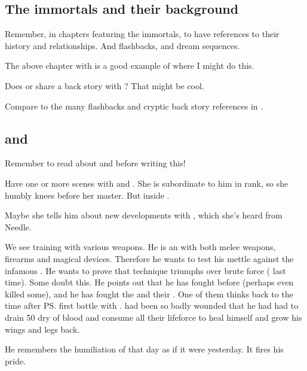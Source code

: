 \subsection{The immortals and their background}
Remember, in chapters featuring the immortals, to have references to their history and relationships. 
And flashbacks, and dream sequences.

The above chapter with \Achsah{} is a good example of where I might do this. 

Does \Achsah{} or \Teshrial{} share a back story with \Ishnaruchaefir? 
That might be cool. 

Compare to the many flashbacks and cryptic back story references in \cite{StevenEriksonIanCameronEsslemont:MalazanBookoftheFallen}. 









\subsection{\Achsah{} and \Teshrial}
Remember to read about  and  before writing this! 

Have one or more scenes with \Achsah{} and \Teshrial. She is subordinate to him in rank, so she humbly knees before her master. But inside . 

Maybe she tells him about new developments with \Tiroco, which she's heard from Needle. 

We see \Teshrial{} training with various weapons. 
He is an  with both melee weapons, firearms and magical devices. 
Therefore he wants to test his mettle against the infamous \Ishnaruchaefir. 
He wants to prove that technique triumphs over brute force ( last time). 
Some \resphain{} doubt this. 
He points out that he has fought \dragons{} before (perhaps even killed some), and he has fought the \Baelzerach{} and their \daemons. 
One of them thinks back to the time after \ps{\Teshrial} first battle with \Ishnaruchaefir. 
\Teshrial{} had been so badly wounded that he had had to drain 50 \humans{} dry of blood and consume all their lifeforce to heal himself and grow his wings and legs back.  

He remembers the humiliation of that day as if it were yesterday. 
It fires his pride. 

